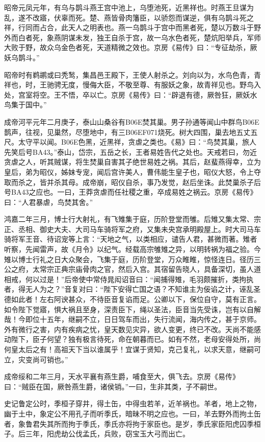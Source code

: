 \documentclass[]{article}
\begin{document}
昭帝元凤元年，有乌与鹊斗燕王宫中池上，乌堕池死，近黑祥也。时燕王旦谋为乱，遂不改寤，伏辜而死。楚、燕皆骨肉籓臣，以骄怨而谋逆，俱有乌鹊斗死之祥，行同而占合，此天人之明表也。燕一乌鹊斗于宫中而黑者死，楚以万数斗于野外而白者死，象燕阴谋未发，独王自杀于宫，故一乌水色者死，楚炕阳举兵，军师大败于野，故众乌金色者死，天道精微之效也。京房《易传》曰：``专征劫杀，厥妖乌鹊斗。''

昭帝时有鹈鹕或曰秃鹙，集昌邑王殿下，王使人射杀之。刘向以为，水鸟色青，青祥也，时，王驰骋无度，慢侮大臣，不敬至尊、有服妖之象，故青祥见也。野鸟入处，宫室将空。王不悟，卒以亡。京房《易传》曰：``辟退有德，厥咎狂，厥妖水鸟集于国中。''

成帝河平元年二月庚子，泰山山桑谷有B06E焚其巢。男子孙通等闻山中群鸟B06E鹊声，往视，见巢然，尽堕地中，有三B06EF071烧死。树大四围，巢去地五丈五尺。太守平以闻。B06E色黑，近黑祥，贪虐之类也。《易》曰：``鸟焚其巢，旅人先笑后号BA43。''泰山，岱宗，五岳之长，王者易姓告代之处也。天戒若曰，勿近贪虐之人，听其贼谋，将生焚巢自害其子绝世易姓之祸。其后，赵蜚燕得幸，立为皇后，弟为昭仪，姊妹专宠，闻后宫许美人，曹伟能生皇子也，昭仪大怒，令上夺取而杀之，皆并杀其母。成帝崩，昭仪自杀，事乃发觉，赵后坐诛。此焚巢杀子后号BA43之应也。一曰，王莽贪虐而任社稷之重，卒成易姓之祸云。京房《易传》曰：``人君暴虐，鸟焚其舍。''

鸿嘉二年三月，博士行大射礼，有飞雉集于庭，历阶登堂而雊。后雉又集太常、宗正、丞相、御史大夫、大司马车骑将军之府，又集未央宫承明殿屋上。时大司马车骑将军王音、待诏宠等上言：``天地之气，以类相应，谴告人君，甚微而著。雉者听察，先闻雷声，故《月令》以纪气。经载高宗雊雉之异，以明转祸为福之验。今雉以博士行礼之日大众聚会，飞集于庭，历阶登堂，万众睢睢，惊怪连日。径历三公之府，太常宗正典宗庙骨肉之官，然后入宫。其宿留告晓人，具备深切，虽人道相戒，何以过是！''后帝使中常侍晁闳诏音曰：``闻捕得雉，毛羽颇摧折，类拘执者，得无人为之？''音复对曰：``陛下安得亡国之语？不知谁主为佞谄之计，诬乱圣德如此者！左右阿谀甚众，不待臣音复谄而足。公卿以下，保位自守，莫有正言。如令陛下觉寤，惧大祸且至身，深责臣下，绳以圣法，臣音当先受诛，岂有以自解哉！今即位十五年，继嗣不立，日日驾车而出，失行流闻，海内传之，甚于京师。外有微行之害，内有疾病之忧，皇天数见灾异，欲人变更，终已不改。天尚不能感动陛下，臣子何望？独有极言待死，命在朝暮而已。如有不然，老母安得处所，尚何皇太后之有！高祖天下当以谁属乎！宜谋于贤知，克己复礼，以求天意，继嗣可立，灾变尚可销也。''

成帝绥和二年三月，天水平襄有燕生爵，哺食至大，俱飞去。京房《易传》曰：``贼臣在国，厥咎燕生爵，诸侯销。''一曰，生非其类，子不嗣世。

史记鲁定公时，季桓子穿井，得土缶，中得虫若羊，近羊祸也。羊者，地上之物，幽于土中，象定公不用孔子而听季氏，暗昧不明之应也。一曰，羊去野外而拘土缶者，象鲁君失其所而拘于季氏，季氏亦将拘于家臣也。是岁，季氏家臣阳虎囚季桓子。后三年，阳虎劫公伐孟氏，兵败，窃宝玉大弓而出亡。
\end{document}
